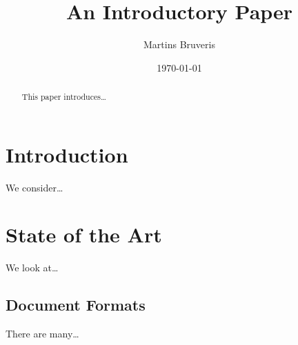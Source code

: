 \documentclass[b6paper,12pt]{article}
\author{Martins Bruveris}
\title{An Introductory Paper}
\date{\today}
\begin{document}
\maketitle
\tableofcontents

\begin{abstract}
This paper introduces\ldots
\end{abstract}

\section{Introduction}
We consider\ldots

\section{State of the Art}
We look at\ldots

\subsection{Document Formats}
There are many\ldots
\end{document}
